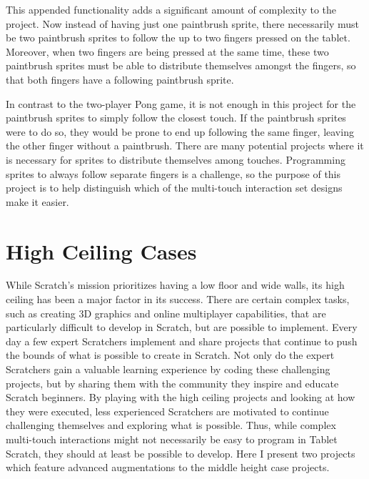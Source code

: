 This appended functionality adds a significant amount of complexity to the project. Now instead of having just one paintbrush sprite, there necessarily must be two paintbrush sprites to follow the up to two fingers pressed on the tablet. Moreover, when two fingers are being pressed at the same time, these two paintbrush sprites must be able to distribute themselves amongst the fingers, so that both fingers have a following paintbrush sprite. 

In contrast to the two-player Pong game, it is not enough in this project for the paintbrush sprites to simply follow the closest touch. If the paintbrush sprites were to do so, they would be prone to end up following the same finger, leaving the other finger without a paintbrush. There are many potential projects where it is necessary for sprites to distribute themselves among touches. Programming sprites to always follow separate fingers is a challenge, so the purpose of this project is to help distinguish which of the multi-touch interaction set designs make it easier.  

\section{High Ceiling Cases}
While Scratch's mission prioritizes having a low floor and wide walls, its high ceiling has been a major factor in its success. There are certain complex tasks, such as creating 3D graphics and online multiplayer capabilities, that are particularly difficult to develop in Scratch, but are possible to implement. Every day a few expert Scratchers implement and share projects that continue to push the bounds of what is possible to create in Scratch. Not only do the expert Scratchers gain a valuable learning experience by coding these challenging projects, but by sharing them with the community they inspire and educate Scratch beginners. By playing with the high ceiling projects and looking at how they were executed, less experienced Scratchers are motivated to continue challenging themselves and exploring what is possible. Thus, while complex multi-touch interactions might not necessarily be easy to program in Tablet Scratch, they should at least be possible to develop. Here I present two projects which feature advanced augmentations to the middle height case projects.

